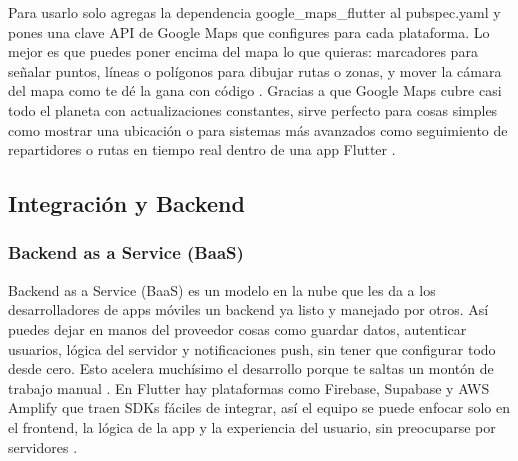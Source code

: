 Para usarlo solo agregas la dependencia google\_maps\_flutter al pubspec.yaml y pones una clave API de Google Maps que configures para cada plataforma. Lo mejor es que puedes poner encima del mapa lo que quieras: marcadores para señalar puntos, líneas o polígonos para dibujar rutas o zonas, y mover la cámara del mapa como te dé la gana con código \cite{GoogleCodelabsMaps}. Gracias a que Google Maps cubre casi todo el planeta con actualizaciones constantes, sirve perfecto para cosas simples como mostrar una ubicación o para sistemas más avanzados como seguimiento de repartidores o rutas en tiempo real dentro de una app Flutter \cite{GoogleDocsMapsConfig}.



\subsection{Integración y Backend}

\subsubsection{Backend as a Service (BaaS)}
Backend as a Service (BaaS) es un modelo en la nube que les da a los desarrolladores de apps móviles un backend ya listo y manejado por otros. Así puedes dejar en manos del proveedor cosas como guardar datos, autenticar usuarios, lógica del servidor y notificaciones push, sin tener que configurar todo desde cero. Esto acelera muchísimo el desarrollo porque te saltas un montón de trabajo manual \cite{Back4appTutorial}. En Flutter hay plataformas como Firebase, Supabase y AWS Amplify que traen SDKs fáciles de integrar, así el equipo se puede enfocar solo en el frontend, la lógica de la app y la experiencia del usuario, sin preocuparse por servidores \cite{TrootechBackendGuide}.

